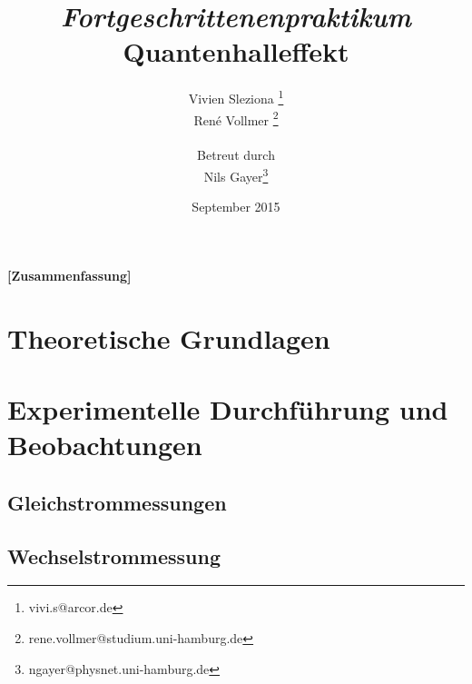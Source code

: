 \documentclass[12pt,a4paper]{article}
\begin{document}
	
	
	
	\title{\textit{Fortgeschrittenenpraktikum}\\\textbf{Quantenhalleffekt} }
	\date{September 2015}
	\author{Vivien Sleziona \footnote{vivi.s@arcor.de}\\ René Vollmer \footnote{rene.vollmer@studium.uni-hamburg.de} \\ \\Betreut durch\\ Nils Gayer\footnote{ngayer@physnet.uni-hamburg.de}}
	
	\maketitle
	
	\begin{center} 
		\bigskip
		\bigskip
		
		\begin{minipage}{0.75\textwidth}
			\textbf{[Zusammenfassung]}
			
		\end{minipage}
	\end{center}
	
	\newpage
	
	\tableofcontents
	\vfill
	\newpage
	\clearpage	
	
	
	\section{Theoretische Grundlagen}
	

	
	\newpage
	\clearpage
	
	\section{Experimentelle Durchführung und Beobachtungen}
	
	
	\clearpage
	\subsection{Gleichstrommessungen}
	\label{ch:dc}
	
	\clearpage
	\subsection{Wechselstrommessung}
	\label{ch:ac}
	
	\clearpage
\end{document}
